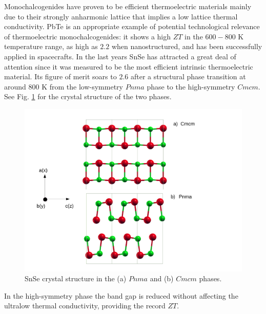 Monochalcogenides have proven to be efficient thermoelectric materials\cite{heremans2008enhancement,zhang2013high,yang2008nanostructures,cho2011thermoelectric} mainly due to their strongly anharmonic lattice that implies a low 
lattice thermal conductivity\cite{delaire2011giant,li2014phonon,iizumi1975phase,o2017inelastic,ribeiro2018strong}. PbTe is an appropriate example of potential technological relevance of thermoelectric monochalcogenides: it shows 
a high $ZT$ in the $600-800$ K temperature range\cite{ravich2013semiconducting}, as high as $2.2$ when nanostructured\cite{hsu2004cubic}, and has been successfully applied in spacecrafts\cite{rowe2018thermoelectrics}. In the last 
years SnSe has attracted a great deal of attention since it was measured to be the most efficient intrinsic thermoelectric material\cite{zhao2014ultralow}. Its figure of merit soars to $2.6$ after a structural phase 
transition\cite{zhao2014ultralow,adouby1998structure,chattopadhyay1986neutron,von1981high,chatterji2018soft} at around $800$ K from the low-symmetry $Pnma$ phase to the high-symmetry $Cmcm$. See Fig. \ref{pnma-cmcm} for the crystal 
structure of the two phases.
\begin{figure}[h]
\begin{center}
\includegraphics[width=0.8\linewidth]{Figures/pnma-cmcm.pdf}
	\caption[SnSe crystal structure]{SnSe crystal structure in the (a) $Pnma$ and (b) $Cmcm$ phases.}
\label{pnma-cmcm}
\end{center}
\end{figure}
In the high-symmetry phase the band gap is reduced without affecting the ultralow thermal conductivity, providing the record $ZT$. \\

